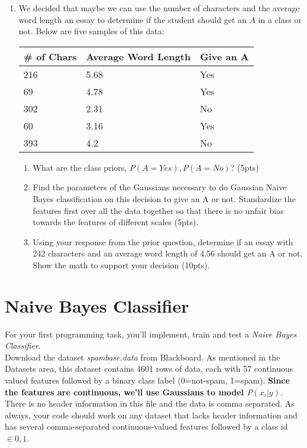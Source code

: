 \documentclass[12pt]{article}
\begin{document}
\begin{enumerate}
\item We decided that maybe we can use the number of characters and the average word length an essay to determine if the student should get an $A$ in a class or not.  Below are five samples of this data:
\begin{table}[h]
\begin{center}
\begin{tabular}{|l|l|l|}
\hline
\# of Chars & Average Word Length & Give an A\\
\hline
216 & 5.68 & Yes\\
69 & 4.78 & Yes\\
302 & 2.31 & No \\
60 & 3.16 & Yes \\
393 & 4.2 & No\\
\hline
\end{tabular}
\end{center}
\end{table}
	\begin{enumerate}
	\item What are the class priors, $P(A=Yes), P(A=No)$? (5pts)
	\item Find the parameters of the Gaussians necessary to do Gaussian Naive Bayes classification on this decision to give an A or not.  Standardize the features first over all the data together so that there is no unfair bias towards the features of different scales (5pts).
	\item Using your response from the prior question, determine if an essay with 242 characters and an average word length of 4.56 should get an A or not.  Show the math to support your decision (10pts).
	\end{enumerate}
\end{enumerate}

\newpage
\section{Naive Bayes Classifier}\label{naive}
For your first programming task, you'll implement, train and test a \emph{Naive Bayes Classifier}.\\

\noindent
Download the dataset \emph{spambase.data} from Blackboard.  As mentioned in the Datasets area, this dataset contains 4601 rows of data, each with 57 continuous valued features followed by a binary class label (0=not-spam, 1=spam).  \textbf{Since the features are continuous, we'll use Gaussians to model $P(x_i|y)$}. There is no header information in this file and the data is comma separated.  As always, your code should work on any dataset that lacks header information and has several comma-separated continuous-valued features followed by a class id $\in {0,1}$.\\
\end{document}
